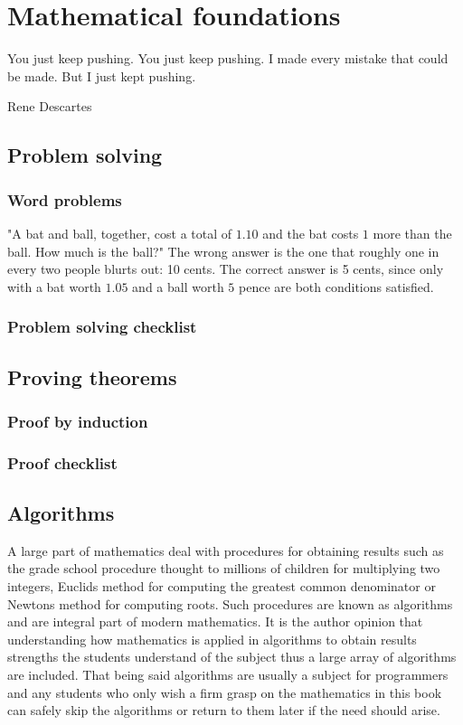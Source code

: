 \chapter{Mathematical foundations}

\epigraph{You just keep pushing. You just keep pushing. I made every mistake that could be made. But I just kept pushing.}{Rene Descartes}

\section{Problem solving}
\subsection{Word problems}
"A bat and ball, together, cost a total of $1.10$ and the bat costs $1$ more than the ball. How much is the ball?" The wrong answer is the one that roughly one in every two people blurts out: 10 cents. The correct answer is 5 cents, since only with a bat worth $1.05$ and a ball worth $5$ pence are both conditions satisfied.

\subsection{Problem solving checklist}

\section{Proving theorems}
\subsection{Proof by induction}
\subsection{Proof checklist}

\section{Algorithms}
A large part of mathematics deal with procedures for obtaining results such as the grade school procedure thought to millions of children for multiplying two integers, Euclids method for computing the greatest common denominator or Newtons method for computing roots. Such procedures are known as algorithms and are integral part of modern mathematics. It is the author opinion that understanding how mathematics is applied in algorithms to obtain results strengths the students understand of the subject thus a large array of algorithms are included. That being said algorithms are usually a subject for programmers and any students who only wish a firm grasp on the mathematics in this book can safely skip the algorithms or return to them later if the need should arise.

